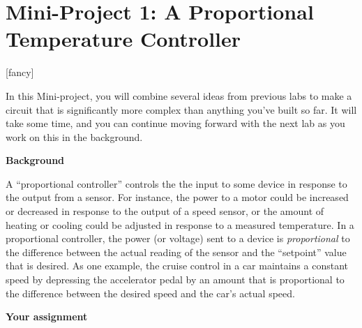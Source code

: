 \section*{Mini-Project 1: A Proportional Temperature Controller}
\label{lab_proportional_controller}

[fancy]{%
	\fancyhead[LO,RE]{}
}
\pagestyle{interlude}



\bigskip

In this Mini-project, you will combine several ideas from previous labs to make a circuit that is significantly more complex than anything you've built so far.  It will take some time, and you can continue moving forward with the next lab as you work on this in the background.  

\medskip

\textbf{Background}

A ``proportional controller'' controls the the input to some device in response to the output from a sensor.  For instance, the power to a motor could be increased or decreased in response to the output of a speed sensor, or the amount of heating or cooling could be adjusted in response to a measured temperature.  
In a proportional controller, the power (or voltage) sent to a device is \textit{proportional} to the difference between the actual reading of the sensor and the ``setpoint'' value that is desired.  As one example, the cruise control in a car maintains a constant speed by depressing the accelerator pedal by an amount that is proportional to the difference between the desired speed and the car's actual speed.

\textbf{Your assignment}

